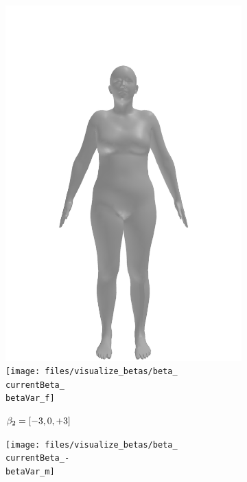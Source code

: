 \begin{figure}[h!]
\begin{subfigure}{\betaWidth}
        \includegraphics[width=\imgWidth]{files/visualize_betas/baseline_f}
        \texttt{[image: files/visualize\_betas/beta\_\\currentBeta\_\\betaVar\_f]}
        \caption{$\beta_2 = [-3, 0, +3]$}
    \end{subfigure}
    \begin{subfigure}{\betaWidth}
        \def\currentBeta{2}
        \centering
        \texttt{[image: files/visualize\_betas/beta\_\\currentBeta\_-\\betaVar\_m]}

\end{subfigure}
\end{figure}
